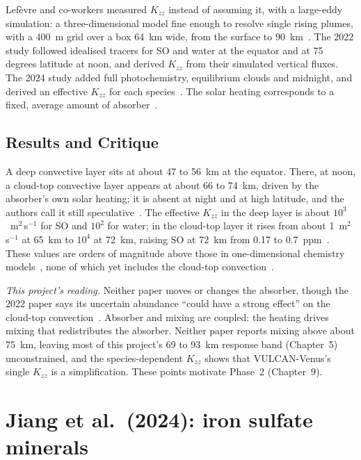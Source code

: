 Lef\`evre and co-workers measured $K_{zz}$ instead of assuming it, with a large-eddy
simulation: a three-dimensional model fine enough to resolve single rising plumes, with a
400~m grid over a box 64~km wide, from the surface to 90~km~\cite{lefevre2022}. The 2022
study followed idealised tracers for SO and water at the equator and at 75 degrees
latitude at noon, and derived $K_{zz}$ from their simulated vertical fluxes. The 2024
study added full photochemistry, equilibrium clouds and midnight, and derived an
effective $K_{zz}$ for each species~\cite{lefevre2024}. The solar heating corresponds to
a fixed, average amount of absorber~\cite{lefevre2022}.

\subsection{Results and Critique}

A deep convective layer sits at about 47 to 56~km at the equator. There, at noon, a cloud-top
convective layer appears at about 66 to 74~km, driven by the absorber's own solar
heating; it is absent at night and at high latitude, and the authors call it still
speculative~\cite{lefevre2022}. The effective $K_{zz}$ in the deep layer is about
$10^{3}$~m$^{2}$\,s$^{-1}$ for SO and $10^{2}$ for water; in the cloud-top layer it
rises from about 1~m$^{2}$\,s$^{-1}$ at 65~km to $10^{4}$ at 72~km, raising SO at
72~km from 0.17 to 0.7~ppm~\cite{lefevre2024}. These values are orders of magnitude above
those in one-dimensional chemistry models~\cite{lefevre2024}, none of which yet includes
the cloud-top convection~\cite{lefevre2022}.

\emph{This project's reading.} Neither paper moves or changes the absorber, though the
2022 paper says its uncertain abundance ``could have a strong effect'' on the cloud-top
convection~\cite{lefevre2022}. Absorber and mixing are coupled: the heating drives mixing
that redistributes the absorber. Neither paper reports mixing above about 75~km, leaving
most of this project's 69 to 93~km response band (Chapter~5) unconstrained, and the
species-dependent $K_{zz}$ shows that VULCAN-Venus's single $K_{zz}$ is a simplification.
These points motivate Phase~2 (Chapter~9).

\section{Jiang et al.\ (2024): iron sulfate minerals}
\label{sec:lit-jiang}

